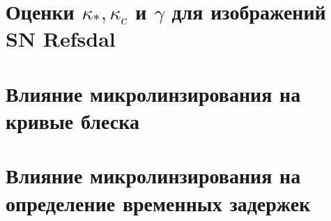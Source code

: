 \section{Оценки $\kappa_*, \kappa_c$ и $\gamma$ для изображений SN Refsdal}
    
    
\section{Влияние микролинзирования на кривые блеска}
    
    
\section{Влияние микролинзирования на определение временных задержек}
    